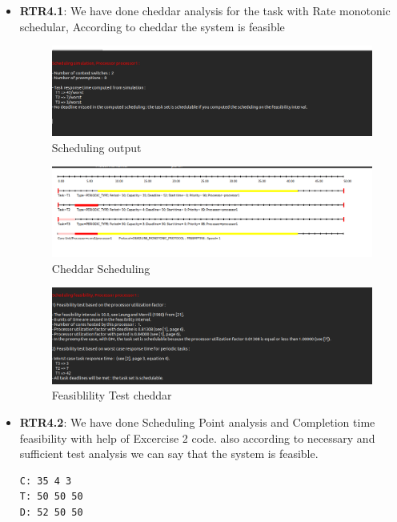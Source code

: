 \documentclass[a4paper,11pt]{article}%
\begin{document}
\begin{itemize}
    \item \textbf{RTR4.1}: We have done cheddar analysis for the task with Rate monotonic schedular, According to cheddar the system is feasible
          \begin{figure}[H]
              \centering
              \includegraphics[scale=0.4]{figures/c.png}
              \caption{Scheduling output}
          \end{figure}
          \begin{figure}[H]
              \centering
              \includegraphics[scale=0.4]{figures/c1.png}
              \caption{Cheddar Scheduling}
          \end{figure}
          \begin{figure}[H]
              \centering
              \includegraphics[scale=0.4]{figures/c3.png}
              \caption{Feasiblility Test cheddar}
          \end{figure}
    \item \textbf{RTR4.2}: We have done Scheduling Point analysis and Completion time feasibility with help of Excercise 2 code. also according to necessary and sufficient test analysis we can say that the system is feasible.
          \begin{lstlisting}
C: 35 4 3 
T: 50 50 50 
D: 52 50 50 


\end{lstlisting}
\end{itemize}
\end{document}
